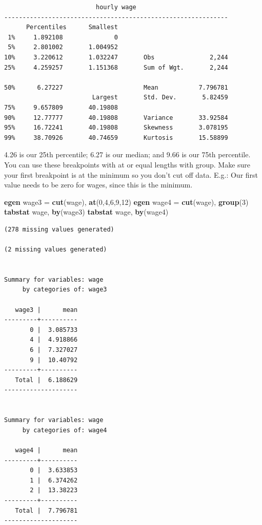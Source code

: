 \documentclass[
]{book}
\newenvironment{Shaded}{\begin{snugshade}}{\end{snugshade}}
\newcommand{\FunctionTok}[1]{\textcolor[rgb]{0.13,0.29,0.53}{\textbf{#1}}}
\newcommand{\KeywordTok}[1]{\textcolor[rgb]{0.13,0.29,0.53}{\textbf{#1}}}
\newcommand{\NormalTok}[1]{#1}
\begin{document}
\begin{verbatim}
                         hourly wage
-------------------------------------------------------------
      Percentiles      Smallest
 1%     1.892108              0
 5%     2.801002       1.004952
10%     3.220612       1.032247       Obs               2,244
25%     4.259257       1.151368       Sum of Wgt.       2,244

50%      6.27227                      Mean           7.796781
                        Largest       Std. Dev.       5.82459
75%     9.657809       40.19808
90%     12.77777       40.19808       Variance       33.92584
95%     16.72241       40.19808       Skewness       3.078195
99%     38.70926       40.74659       Kurtosis       15.58899
\end{verbatim}

4.26 is our 25th percentile; 6.27 is our median; and 9.66 is our 75th percentile. You can use these breakpoints with at or equal lengths with group. Make sure your first breakpoint is at the minimum so you don't cut off data. E.g.: Our first value needs to be zero for wages, since this is the minimum.

\begin{Shaded}
\begin{Highlighting}[]
\KeywordTok{egen}\NormalTok{ wage3 = }\FunctionTok{cut}\NormalTok{(wage), }\FunctionTok{at}\NormalTok{(0,4,6,9,12)}
\KeywordTok{egen}\NormalTok{ wage4 = }\FunctionTok{cut}\NormalTok{(wage), }\FunctionTok{group}\NormalTok{(3)}
\KeywordTok{tabstat}\NormalTok{ wage, }\KeywordTok{by}\NormalTok{(wage3)}
\KeywordTok{tabstat}\NormalTok{ wage, }\KeywordTok{by}\NormalTok{(wage4)}
\end{Highlighting}
\end{Shaded}

\begin{verbatim}
(278 missing values generated)

(2 missing values generated)


Summary for variables: wage
     by categories of: wage3 

   wage3 |      mean
---------+----------
       0 |  3.085733
       4 |  4.918866
       6 |  7.327027
       9 |  10.40792
---------+----------
   Total |  6.188629
--------------------


Summary for variables: wage
     by categories of: wage4 

   wage4 |      mean
---------+----------
       0 |  3.633853
       1 |  6.374262
       2 |  13.38223
---------+----------
   Total |  7.796781
--------------------
\end{verbatim}
\end{document}
